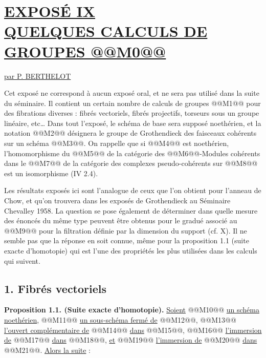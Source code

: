 
\section*{\underline{EXPOSÉ IX}\\[3pt] \underline{\underline{QUELQUES CALCULS DE GROUPES @@M0@@}}}
\begin{center}
\underline{par P. BERTHELOT}
\end{center}

Cet exposé ne correspond à aucun exposé oral, et ne sera pas utilisé dans la suite du séminaire. Il contient un certain nombre de calculs de groupes @@M1@@ pour des fibrations diverses : fibrés vectoriels, fibrés projectifs, torseurs sous un groupe linéaire, etc\ldots{} Dans tout l'exposé, le schéma de base sera supposé noethérien, et la notation @@M2@@ désignera le groupe de Grothendieck des faisceaux cohérents sur un schéma @@M3@@. On rappelle que si @@M4@@ est noethérien, l'homomorphisme du @@M5@@ de la catégorie des @@M6@@-Modules cohérents dans le @@M7@@ de la catégorie des complexes pseudo-cohérents sur @@M8@@ est un isomorphisme (IV 2.4).

Les résultats exposés ici sont l'analogue de ceux que l'on obtient pour l'anneau de Chow, et qu'on trouvera dans les exposés de Grothendieck au Séminaire Chevalley 1958. La question se pose également de déterminer dans quelle mesure des énoncés du même type peuvent être obtenus pour le gradué associé au @@M9@@ pour la filtration définie par la dimension du support (cf. X). Il ne semble pas que la réponse en soit connue, même pour la proposition 1.1 (suite exacte d'homotopie) qui est l'une des propriétés les plus utilisées dans les calculs qui suivent.

\subsection*{1. Fibrés vectoriels}

\textbf{Proposition 1.1. (Suite exacte d'homotopie).} \uline{Soient} @@M10@@ \uline{un schéma noethérien}, @@M11@@ \uline{un sous-schéma fermé de} @@M12@@, @@M13@@ \uline{l'ouvert complémentaire de} @@M14@@ \uline{dans} @@M15@@, @@M16@@ \uline{l'immersion de} @@M17@@ \uline{dans} @@M18@@, \uline{et} @@M19@@ \uline{l'immersion de} @@M20@@ \uline{dans} @@M21@@. \uline{Alors la suite} :
